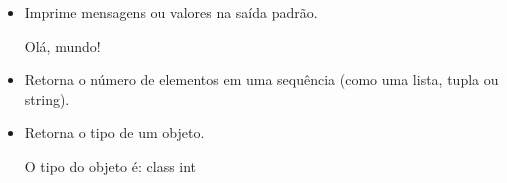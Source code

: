 \documentclass[letterpaper,10pt,english]{jupyterBook}
\begin{document}
\begin{itemize}
\item {} 
\sphinxAtStartPar
{} Imprime mensagens ou valores na saída padrão.

\begin{sphinxVerbatim}[commandchars=\\\{\}]
\end{sphinxVerbatim}

\begin{sphinxVerbatim}[commandchars=\\\{\}]
Olá, mundo!
\end{sphinxVerbatim}

\item {} 
\sphinxAtStartPar
{} Retorna o número de elementos em uma sequência (como uma lista, tupla ou string).

\begin{sphinxVerbatim}[commandchars=\\\{\}]
  
\end{sphinxVerbatim}

\begin{sphinxVerbatim}[commandchars=\\\{\}]
     
\end{sphinxVerbatim}

\item {} 
\sphinxAtStartPar
{} Retorna o tipo de um objeto.

\begin{sphinxVerbatim}[commandchars=\\\{\}]
  
\end{sphinxVerbatim}

\begin{sphinxVerbatim}[commandchars=\\\{\}]
O tipo do objeto é: \PYGZlt{}class \PYGZsq{}int\PYGZsq{}\PYGZgt{}
\end{sphinxVerbatim}

\end{itemize}
\end{document}
